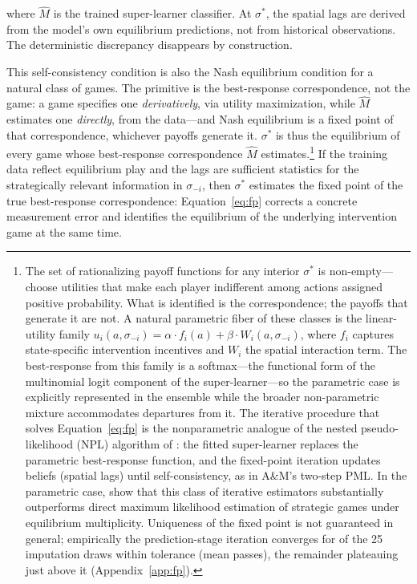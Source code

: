 \noindent where $\hat{M}$ is the trained super-learner classifier.  At $\sigma^*$,
the spatial lags are derived from the model's own equilibrium predictions,
not from historical observations.
The deterministic discrepancy disappears by construction.

This self-consistency condition is also the Nash equilibrium condition for
a natural class of games.  The primitive is the best-response
correspondence, not the game: a game specifies one \textit{derivatively},
via utility maximization, while $\hat{M}$ estimates one \textit{directly},
from the data---and Nash equilibrium is a fixed point of that
correspondence, whichever payoffs generate it.  $\sigma^*$ is thus the
equilibrium of every game whose best-response correspondence $\hat{M}$
estimates.\footnote{%
  The set of rationalizing payoff functions for any interior $\sigma^*$
  is non-empty---choose utilities that make each player indifferent among
  actions assigned positive probability.  What is identified is the
  correspondence; the payoffs that generate it are not.  A natural
  parametric fiber of these classes is the linear-utility family
  $u_i(a, \sigma_{-i}) = \alpha \cdot f_i(a) + \beta \cdot W_i(a, \sigma_{-i})$,
  where $f_i$ captures state-specific intervention incentives and $W_i$
  the spatial interaction term.  The best-response from this family is a
  softmax---the functional form of the multinomial logit component of
  the super-learner---so the parametric case is explicitly represented
  in the ensemble while the broader non-parametric mixture accommodates
  departures from it.  The iterative procedure that solves Equation~\eqref{eq:fp}
  is the nonparametric analogue of the nested pseudo-likelihood (NPL) algorithm
  of \citet{aguirregabiriamira2007}: the fitted
  super-learner replaces the parametric best-response function,
  and the fixed-point iteration updates beliefs (spatial lags) until
  self-consistency, as in A\&M's two-step PML.  In the parametric case,
  \citet{crismancox2021} show that this class of
  iterative estimators substantially outperforms direct maximum likelihood
  estimation of strategic games under equilibrium multiplicity.
  Uniqueness of the fixed point is not guaranteed in general; empirically the prediction-stage iteration
  converges for \FPconv{} of the 25 imputation draws within tolerance (mean
  \FPiterMean{} passes), the remainder plateauing just above it (Appendix~\ref{app:fp}).}
If the training data reflect equilibrium play and the lags are sufficient
statistics for the strategically relevant information in $\sigma_{-i}$, then
$\sigma^*$ estimates the fixed point of the true best-response
correspondence: Equation~\eqref{eq:fp} corrects a concrete measurement error
and identifies the equilibrium of the underlying intervention game at the
same time.

